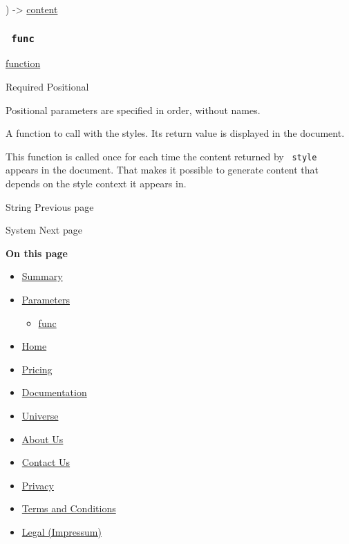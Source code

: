 ) -\textgreater{} \href{/docs/reference/foundations/content/}{content}

\subsubsection{\texorpdfstring{\texttt{\ func\ }}{ func }}\label{parameters-func}

\href{/docs/reference/foundations/function/}{function}

{Required} {{ Positional }}

\label{parameters-func-positional-tooltip}
Positional parameters are specified in order, without names.

A function to call with the styles. Its return value is displayed in the
document.

This function is called once for each time the content returned by
\texttt{\ style\ } appears in the document. That makes it possible to
generate content that depends on the style context it appears in.

\href{/docs/reference/foundations/str/}{\pandocbounded{}}

{ String } { Previous page }

\href{/docs/reference/foundations/sys/}{\pandocbounded{}}

{ System } { Next page }

\textbf{On this page}

\begin{itemize}
\tightlist
\item
  \hyperref[summary]{Summary}
\item
  \hyperref[parameters]{Parameters}

  \begin{itemize}
  \tightlist
  \item
    \hyperref[parameters-func]{func}
  \end{itemize}
\end{itemize}

\begin{itemize}
\tightlist
\item
  \href{/}{Home}
\item
  \href{/pricing/}{Pricing}
\item
  \href{/docs/}{Documentation}
\item
  \href{/universe/}{Universe}
\item
  \href{/about/}{About Us}
\item
  \href{/contact/}{Contact Us}
\item
  \href{/privacy/}{Privacy}
\item
  \href{https://typst.app/terms}{Terms and Conditions}
\item
  \href{/legal/}{Legal (Impressum)}
\end{itemize}

